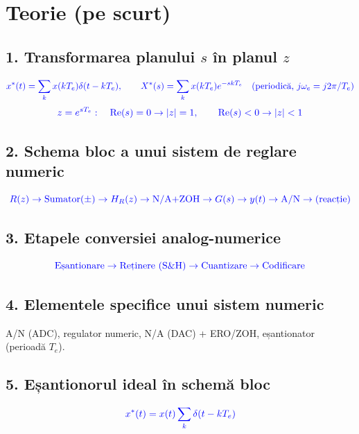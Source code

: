 \documentclass[10pt,a4paper]{article}
\begin{document}
\section*{Teorie (pe scurt)}

\subsection*{1. Transformarea planului $s$ în planul $z$}
$$\color{blue}x^*(t)=\sum_k x(kT_e)\delta(t-kT_e),\qquad X^*(s)=\sum_k x(kT_e)e^{-skT_e}\quad(\text{periodică, }j\omega_e=j2\pi/T_e)$$
$$\color{blue}z=e^{sT_e}:\quad \mathrm{Re}(s)=0\to|z|=1,\qquad \mathrm{Re}(s)<0\to|z|<1$$

\subsection*{2. Schema bloc a unui sistem de reglare numeric}
$$\color{blue}R(z)\to\text{Sumator}(\pm)\to H_R(z)\to\text{N/A+ZOH}\to G(s)\to y(t)\to\text{A/N}\to(\text{reacție})$$

\subsection*{3. Etapele conversiei analog-numerice}
$$\color{blue}\text{Eșantionare}\to\text{Reținere (S\&H)}\to\text{Cuantizare}\to\text{Codificare}$$

\subsection*{4. Elementele specifice unui sistem numeric}
A/N (ADC), regulator numeric, N/A (DAC) + ERO/ZOH, eșantionator (perioadă $T_e$).

\subsection*{5. Eșantionorul ideal în schemă bloc}
$$\color{blue}x^*(t)=x(t)\sum_k\delta(t-kT_e)$$
\end{document}
